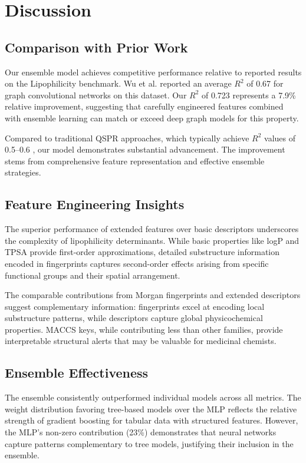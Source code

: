 \documentclass[12pt,a4paper]{article}
\begin{document}
\section{Discussion}

\subsection{Comparison with Prior Work}

Our ensemble model achieves competitive performance relative to reported results on the Lipophilicity benchmark. Wu et al. \citep{wu2018moleculenet} reported an average $R^2$ of 0.67 for graph convolutional networks on this dataset. Our $R^2$ of 0.723 represents a 7.9\% relative improvement, suggesting that carefully engineered features combined with ensemble learning can match or exceed deep graph models for this property.

Compared to traditional QSPR approaches, which typically achieve $R^2$ values of 0.5--0.6 \citep{zhang2015evaluation}, our model demonstrates substantial advancement. The improvement stems from comprehensive feature representation and effective ensemble strategies.

\subsection{Feature Engineering Insights}

The superior performance of extended features over basic descriptors underscores the complexity of lipophilicity determinants. While basic properties like logP and TPSA provide first-order approximations, detailed substructure information encoded in fingerprints captures second-order effects arising from specific functional groups and their spatial arrangement.

The comparable contributions from Morgan fingerprints and extended descriptors suggest complementary information: fingerprints excel at encoding local substructure patterns, while descriptors capture global physicochemical properties. MACCS keys, while contributing less than other families, provide interpretable structural alerts that may be valuable for medicinal chemists.

\subsection{Ensemble Effectiveness}

The ensemble consistently outperformed individual models across all metrics. The weight distribution favoring tree-based models over the MLP reflects the relative strength of gradient boosting for tabular data with structured features. However, the MLP's non-zero contribution (23\%) demonstrates that neural networks capture patterns complementary to tree models, justifying their inclusion in the ensemble.
\end{document}
